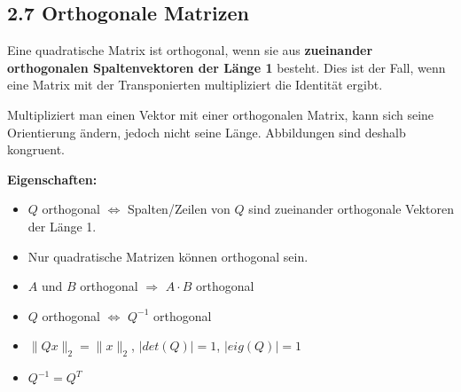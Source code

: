 \subsection{2.7 Orthogonale Matrizen}{


Eine quadratische Matrix ist orthogonal, wenn sie aus \textbf{zueinander orthogonalen Spaltenvektoren der Länge 1} besteht. Dies ist der Fall, wenn eine Matrix mit der Transponierten multipliziert die Identität ergibt.


\begin{center}
\end{center}

Multipliziert man einen Vektor mit einer orthogonalen Matrix, kann sich seine Orientierung ändern, jedoch nicht seine Länge. Abbildungen sind deshalb kongruent.

\vskip5pt

\textbf{Eigenschaften:}

\vspace{-3pt}

\begin{itemize}[leftmargin=0.29cm, itemsep=0.5pt]
\item $Q$ orthogonal $\Leftrightarrow$ Spalten/Zeilen von $Q$ sind zueinander orthogonale Vektoren der Länge 1.
\item Nur quadratische Matrizen können orthogonal sein.
\item $A$ und $B$ orthogonal $\Rightarrow$ $A \cdot B$ orthogonal
\item $Q$ orthogonal $\Leftrightarrow$ $Q^{-1}$ orthogonal
\item $\|Qx\|_2 = \|x\|_2$, $|det(Q)| = 1$, $|eig(Q)| = 1$
\item $Q^{-1} = Q^T$
\end{itemize}
\vspace{-5pt}

}
